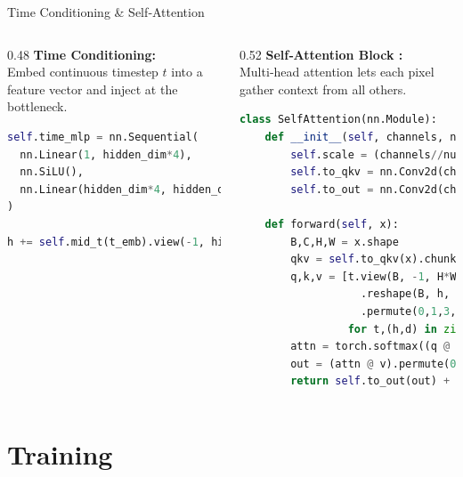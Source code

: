\documentclass[10pt]{beamer}
\begin{document}
\begin{frame}[fragile]{Time Conditioning \& Self‑Attention}
  \begin{columns}[T]
    \begin{column}{0.48\textwidth}
      \textbf{Time Conditioning:}\\
      Embed continuous timestep \(t\) into a feature vector and inject at the bottleneck.
      \medskip
      \scriptsize
      \begin{lstlisting}[language=Python,
                            basicstyle=\ttfamily\tiny,
                            numbers=none,
                            frame=single]
self.time_mlp = nn.Sequential(
  nn.Linear(1, hidden_dim*4),
  nn.SiLU(),
  nn.Linear(hidden_dim*4, hidden_dim)
)

h += self.mid_t(t_emb).view(-1, hidden_dim, 1, 1)
      \end{lstlisting}
      \normalsize
    \end{column}

    \begin{column}{0.52\textwidth}
      \textbf{Self‑Attention Block :}\\
      Multi‑head attention lets each pixel gather context from all others.
      \medskip
      \scriptsize
      \begin{lstlisting}[language=Python,
                            basicstyle=\ttfamily\tiny,
                            numbers=none,
                            frame=single]
class SelfAttention(nn.Module):
    def __init__(self, channels, num_heads=8):
        self.scale = (channels//num_heads)**-0.5
        self.to_qkv = nn.Conv2d(channels, channels*3, 1, bias=False)
        self.to_out = nn.Conv2d(channels, channels, 1)

    def forward(self, x):
        B,C,H,W = x.shape
        qkv = self.to_qkv(x).chunk(3, dim=1)
        q,k,v = [t.view(B, -1, H*W)
                   .reshape(B, h, d, H*W)
                   .permute(0,1,3,2)
                 for t,(h,d) in zip(qkv, [(8,C//8)]*3)]
        attn = torch.softmax((q @ k.transpose(-1,-2))*self.scale, -1)
        out = (attn @ v).permute(0,1,3,2).reshape(B,C,H,W)
        return self.to_out(out) + x
      \end{lstlisting}
      \normalsize
    \end{column}
  \end{columns}
\end{frame}

\section{Training}
\end{document}
